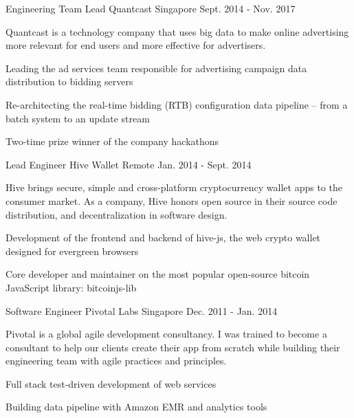 \begin{cventries}
  \cventry
    {Engineering Team Lead} %
    {Quantcast} %
    {Singapore} %
    {Sept. 2014 - Nov. 2017} %
    {
      Quantcast is a technology company that uses big data to make online advertising more relevant for end users and more effective for advertisers.
      \begin{cvitems} %
        \item Leading the ad services team responsible for advertising campaign data distribution to bidding servers
        \item Re-architecting the real-time bidding (RTB) configuration data pipeline – from a batch system to an update stream
        \item Two-time prize winner of the company hackathons
      \end{cvitems}
    }

  \cventry
    {Lead Engineer} %
    {Hive Wallet} %
    {Remote} %
    {Jan. 2014 - Sept. 2014} %
    {
      Hive brings secure, simple and cross-platform cryptocurrency wallet apps to the consumer market. As a company, Hive honors open source in their source code distribution, and decentralization in software design.
      \begin{cvitems} %
        \item Development of the frontend and backend of hive-js, the web crypto wallet designed for evergreen browsers
        \item Core developer and maintainer on the most popular open-source bitcoin JavaScript library: bitcoinjs-lib
      \end{cvitems}
    }

  \cventry
    {Software Engineer} %
    {Pivotal Labs} %
    {Singapore} %
    {Dec. 2011 - Jan. 2014} %
    {
      Pivotal is a global agile development consultancy. I was trained to become a consultant to help our clients create their app from scratch while building their engineering team with agile practices and principles.
      \begin{cvitems} %
        \item Full stack test-driven development of web services
        \item Building data pipeline with Amazon EMR and analytics tools
      \end{cvitems}
    }
\end{cventries}
